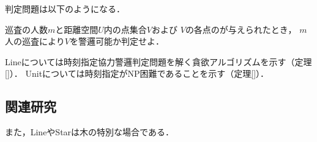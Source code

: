 判定問題は以下のようになる．

\begin{timeSpecifiedCooperativePatrollingProblemDecision}
  巡査の人数$m$と距離空間$U$内の点集合$V$および
  $V$の各点の{\exactidletime}が与えられたとき，
  $m$人の巡査により$V$を警邏可能か判定せよ．
\end{timeSpecifiedCooperativePatrollingProblemDecision}


Lineについては時刻指定協力警邏判定問題を解く貪欲アルゴリズムを示す（定理\ref{}）．
Unitについては時刻指定{\patProb}がNP困難であることを示す（定理\ref{}）．




\subsection*{関連研究}



また，LineやStarは木の特別な場合である．
